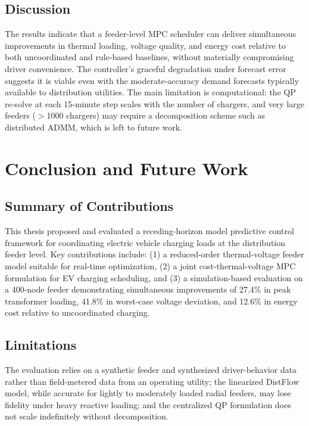 \documentclass[12pt,twoside]{report}
\begin{document}
\section{Discussion}
The results indicate that a feeder-level MPC scheduler can deliver simultaneous improvements
in thermal loading, voltage quality, and energy cost relative to both uncoordinated and
rule-based baselines, without materially compromising driver convenience. The controller's
graceful degradation under forecast error suggests it is viable even with the moderate-accuracy
demand forecasts typically available to distribution utilities. The main limitation is
computational: the QP re-solve at each 15-minute step scales with the number of chargers, and
very large feeders (\(>\)1000 chargers) may require a decomposition scheme such as distributed
ADMM, which is left to future work.

\chapter{Conclusion and Future Work}
\label{ch:conclusion}

\section{Summary of Contributions}
This thesis proposed and evaluated a receding-horizon model predictive control framework for
coordinating electric vehicle charging loads at the distribution feeder level. Key
contributions include: (1) a reduced-order thermal-voltage feeder model suitable for real-time
optimization, (2) a joint cost-thermal-voltage MPC formulation for EV charging scheduling, and
(3) a simulation-based evaluation on a 400-node feeder demonstrating simultaneous improvements
of 27.4\% in peak transformer loading, 41.8\% in worst-case voltage deviation, and 12.6\% in
energy cost relative to uncoordinated charging.

\section{Limitations}
The evaluation relies on a synthetic feeder and synthesized driver-behavior data rather than
field-metered data from an operating utility; the linearized DistFlow model, while accurate for
lightly to moderately loaded radial feeders, may lose fidelity under heavy reactive loading; and
the centralized QP formulation does not scale indefinitely without decomposition.
\end{document}
